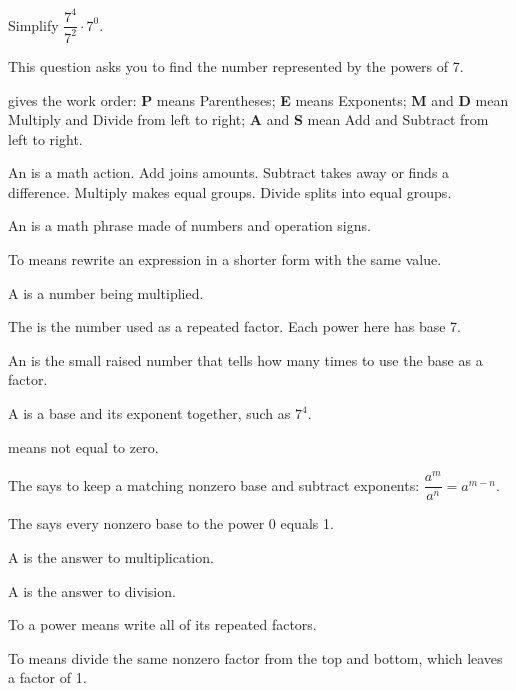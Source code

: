 
Simplify $\dfrac{7^{4}}{7^{2}} \cdot 7^{0}$.


This question asks you to find the number represented by the powers of 7.

\begin{words}
  \item {}gives the work order: \textbf{P} means Parentheses;
    \textbf{E} means Exponents; \textbf{M} and \textbf{D} mean Multiply and
    Divide from left to right; \textbf{A} and \textbf{S} mean Add and Subtract
    from left to right.
  \item An is a math action. Add joins amounts. Subtract takes
    away or finds a difference. Multiply makes equal groups. Divide splits into
    equal groups.
  \item An is a math phrase made of numbers and operation signs.
  \item To means rewrite an expression in a shorter form with the
    same value.
  \item A is a number being multiplied.
  \item The is the number used as a repeated factor. Each power here
    has base 7.
  \item An is the small raised number that tells how many times to
    use the base as a factor.
  \item A is a base and its exponent together, such as $7^{4}$.
  \item {}means not equal to zero.
  \item The says to keep a matching nonzero base and
    subtract exponents: $\dfrac{a^{m}}{a^{n}} = a^{m-n}$.
  \item The says every nonzero base to the power 0
    equals 1.
  \item A is the answer to multiplication.
  \item A is the answer to division.
  \item To a power means write all of its repeated factors.
  \item To means divide the same nonzero factor
    from the top and bottom, which leaves a factor of 1.
\end{words}

